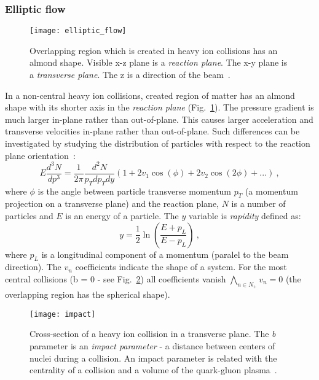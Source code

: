       \subsubsection{Elliptic flow}
        \begin{figure}[b]
          \centering
          \texttt{[image: elliptic\_flow]}
          \caption{Overlapping region which is created in heavy ion collisions has an almond shape. Visible x-z plane is a \textit{reaction plane}. The x-y plane is a \textit{transverse plane}. The z is a direction of the beam~\cite{eflow}.}
          \label{fig:elliptic_flow}
        \end{figure}
        In a non-central heavy ion collisions, created region of matter has an almond shape with its shorter axis in the \textit{reaction plane} (Fig.~\ref{fig:elliptic_flow}).
        The pressure gradient is much larger in-plane rather than out-of-plane.
        This causes larger acceleration and transverse velocities in-plane rather than out-of-plane.
        Such differences can be investigated by studying the distribution of particles with respect to the reaction plane orientation~\cite{hip}:
        \begin{equation}
          E\frac{d^3 N}{d p^3} = \frac{1}{2\pi} \frac{d^2 N}{p_T d p_T d y} (1 + 2 v_1 \cos(\phi) + 2 v_2 \cos(2 \phi) + ...)~,
          \label{eq:elliptic_flow}
        \end{equation}
        where $\phi$ is the angle between particle transverse momentum $p_T$ (a momentum projection on a transverse plane) and the reaction plane, $N$ is a number of particles and $E$ is an energy of a particle.
        The $y$ variable is \textit{rapidity} defined as:
        \begin{equation}
          y = \frac{1}{2} \ln \left( \frac{E+ p_L}{E - p_L} \right)~,
        \end{equation}
        where $p_L$ is a longitudinal component of a momentum (paralel to the beam direction).
        The $v_n$ coefficients indicate the shape of a system.
        For the most central collisions (b = 0 - see Fig.~\ref{fig:impact_parameter}) all coefficients vanish $\bigwedge_{n \in N_{+}} v_n = 0$ (the overlapping region has the spherical shape).
        \begin{figure}[b]
          \centering
          \texttt{[image: impact]}
          \caption{Cross-section of a heavy ion collision in a transverse plane. 
          The \textit{b} parameter is an \textit{impact parameter} - a distance between centers of nuclei during a collision. An impact parameter is related with the centrality of a collision and a volume of the quark-gluon plasma~\cite{hip}.}
          \label{fig:impact_parameter}
        \end{figure}
